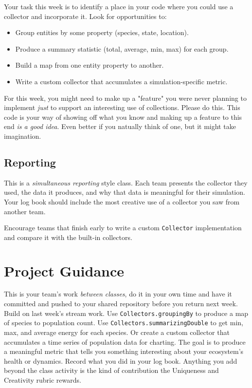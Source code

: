 \documentclass[twoside=false,DIV=14]{scrartcl}
\begin{document}
Your task this week is to identify a place in your code where you could use a collector and incorporate it.  Look for opportunities to:
\begin{itemize}
\itemsep0em
\item Group entities by some property (species, state, location).
\item Produce a summary statistic (total, average, min, max) for each group.
\item Build a map from one entity property to another.
\item Write a custom collector that accumulates a simulation-specific metric.
\end{itemize}

For this week, you might need to make up a "feature" you were never planning to implement \emph{just} to support an interesting use of collections.  Please do this.  This code is your way of showing off what you know and making up a feature to this end \emph{is a good idea}.  Even better if you natually think of one, but it might take imagination.

\subsection*{Reporting}

This is a \emph{simultaneous reporting} style class.  Each team presents the collector they used, the data it produces, and why that data is meaningful for their simulation.  Your log book should include the most creative use of a collector you saw from another team.

\begin{teacher}
Encourage teams that finish early to write a custom \texttt{Collector} implementation and compare it with the built-in collectors.
\end{teacher}

\section*{Project Guidance}

This is your team's work \emph{between classes}, do it in your own time and have it committed and pushed to your shared repository before you return next week.  Build on last week's stream work.  Use \texttt{Collectors.groupingBy} to produce a map of species to population count.  Use \texttt{Collectors.summarizingDouble} to get min, max, and average energy for each species.  Or create a custom collector that accumulates a time series of population data for charting.  The goal is to produce a meaningful metric that tells you something interesting about your ecosystem's health or dynamics.  Record what you did in your log book.  Anything you add beyond the class activity is the kind of contribution the Uniqueness and Creativity rubric rewards.
\end{document}
